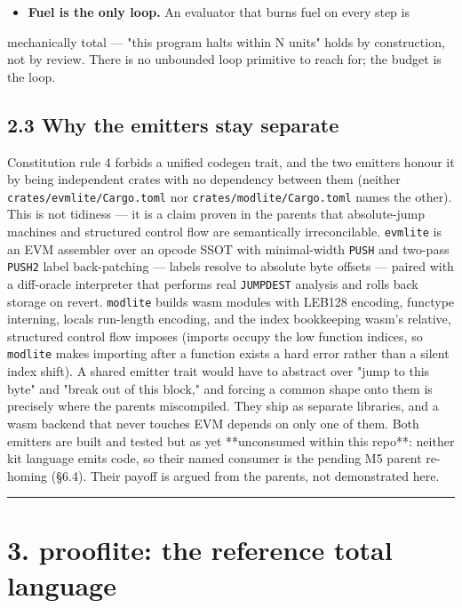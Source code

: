 \documentclass[11pt]{article}
\newcommand{\code}[1]{\texttt{#1}}
\begin{document}
\begin{itemize}[leftmargin=*]
\item \textbf{Fuel is the only loop.} An evaluator that burns fuel on every step is
\end{itemize}
  mechanically total --- "this program halts within N units" holds by
  construction, not by review. There is no unbounded loop primitive to reach
  for; the budget is the loop.

\subsection*{2.3 Why the emitters stay separate}

Constitution rule 4 forbids a unified codegen trait, and the two emitters
honour it by being independent crates with no dependency between them (neither
\code{crates/evmlite/Cargo.toml} nor \code{crates/modlite/Cargo.toml} names the other).
This is not tidiness --- it is a claim proven in the parents that absolute-jump
machines and structured control flow are semantically irreconcilable. \code{evmlite}
is an EVM assembler over an opcode SSOT with minimal-width \code{PUSH} and two-pass
\code{PUSH2} label back-patching --- labels resolve to absolute byte offsets --- paired
with a diff-oracle interpreter that performs real \code{JUMPDEST} analysis and rolls
back storage on revert. \code{modlite} builds wasm modules with LEB128 encoding,
functype interning, locals run-length encoding, and the index bookkeeping
wasm's relative, structured control flow imposes (imports occupy the low
function indices, so \code{modlite} makes importing after a function exists a hard
error rather than a silent index shift). A shared emitter trait would have to
abstract over "jump to this byte" and "break out of this block," and forcing a
common shape onto them is precisely where the parents miscompiled. They ship as
separate libraries, and a wasm backend that never touches EVM depends on only
one of them. Both emitters are built and tested but as yet **unconsumed within
this repo**: neither kit language emits code, so their named consumer is the
pending M5 parent re-homing (\S{}6.4). Their payoff is argued from the parents, not
demonstrated here.

\bigskip\hrule\bigskip

\section*{3. prooflite: the reference total language}
\end{document}
